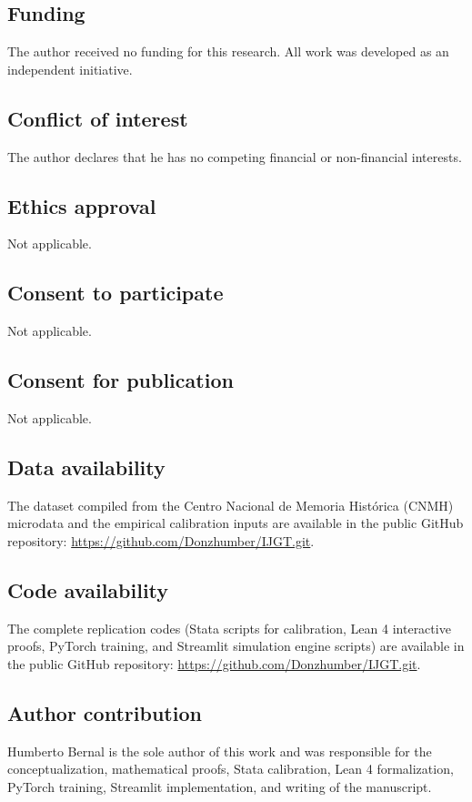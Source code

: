 \documentclass[pdflatex,sn-mathphys-ay]{sn-jnl}
\theoremstyle{plain}
\theoremstyle{definition}
\newcommand{\1}{\mathbf{1}}
\begin{document}
\subsection*{Funding}
The author received no funding for this research. All work was developed as an independent initiative.

\subsection*{Conflict of interest}
The author declares that he has no competing financial or non-financial interests.

\subsection*{Ethics approval}
Not applicable.

\subsection*{Consent to participate}
Not applicable.

\subsection*{Consent for publication}
Not applicable.

\subsection*{Data availability}
The dataset compiled from the Centro Nacional de Memoria Histórica (CNMH) microdata and the empirical calibration inputs are available in the public GitHub repository: \url{https://github.com/Donzhumber/IJGT.git}.

\subsection*{Code availability}
The complete replication codes (Stata scripts for calibration, Lean 4 interactive proofs, PyTorch training, and Streamlit simulation engine scripts) are available in the public GitHub repository: \url{https://github.com/Donzhumber/IJGT.git}.

\subsection*{Author contribution}
Humberto Bernal is the sole author of this work and was responsible for the conceptualization, mathematical proofs, Stata calibration, Lean 4 formalization, PyTorch training, Streamlit implementation, and writing of the manuscript.


\end{document}
